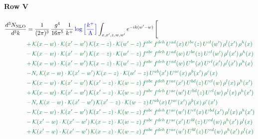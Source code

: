 \documentclass[10pt]{article}
\numberwithin{equation}{section}
\newcommand{\new}[1]{{\color{blue}#1}}
\begin{document}
\paragraph{Row V}
\begin{align}
\frac{d^{3}N_{\mathrm{NLO}}}{d^{3}k} & = \frac{1}{(2\pi)^{3}}\,\frac{g^{4}}{16\pi^{5}}\,\frac{1}{k^{+}}\,\new{\log\Big[\frac{k^{+}}{\Lambda}\Big]}\int_{x,x',z,w,w'}e^{-ik(w'-w)}\,\Bigg[\notag\\ &{\color{JIM}  +\,\mathcal{K}(x-w)\cdot\mathcal{K}(x'-w')\,\mathcal{K}(x-z)\cdot\mathcal{K}(w'-z)\,f^{abc}\,f^{deh}\,U^{ad}(x)\,U^{be}(z)\,U^{cl}(w')\,\rho^{l}(x')\,\rho^{h}(x)} \notag\\
&{\color{JIM} -\,\mathcal{K}(x-w)\cdot\mathcal{K}(x'-w')\,\mathcal{K}(x-z)\cdot\mathcal{K}(w'-z)\,f^{abc}\,f^{deh}\,U^{ad}(w)\,U^{be}(z)\,U^{cl}(w')\,\rho^{l}(x')\,\rho^{h}(x)} \notag\\
&{\color{JIM} +\,\mathcal{K}(x-w)\cdot\mathcal{K}(x'-w')\,\mathcal{K}(x-z)\cdot\mathcal{K}(w'-z)\,f^{abc}\,f^{deh}\,U^{ad}(w)\,U^{be}(x)\,U^{cl}(x')\,\rho^{l}(x')\,\rho^{h}(x)} \notag\\
&{\color{JIM} -N_{c}\,\mathcal{K}(x-w)\cdot\mathcal{K}(x'-w')\,\mathcal{K}(x-z)\cdot\mathcal{K}(w'-z)\,U^{ab}(x')\,U^{ac}(x)\,\rho^{b}(x')\,\rho^{c}(x)} \notag\\
&{\color{JIM} -\,\mathcal{K}(x-w)\cdot\mathcal{K}(x'-w')\,\mathcal{K}(x'-z)\cdot\mathcal{K}(w-z)\,f^{abc}\,f^{deh}\,U^{ae}(x')\,U^{bd}(z)\,U^{cl}(w)\,\rho^{l}(x)\,\rho^{h}(x')} \notag\\
&{\color{JIM} +\,\mathcal{K}(x-w)\cdot\mathcal{K}(x'-w')\,\mathcal{K}(x'-z)\cdot\mathcal{K}(w-z)\,f^{abc}\,f^{deh}\,U^{ae}(w')\,U^{bd}(z)\,U^{cl}(w)\,\rho^{l}(x)\,\rho^{h}(x')} \notag\\
&{\color{JIM} -N_{c}\,\mathcal{K}(x-w)\cdot\mathcal{K}(x'-w')\,\mathcal{K}(x'-z)\cdot\mathcal{K}(w-z)\,U^{ab}(x)\,U^{ac}(x')\,\rho^{b}(x)\,\rho^{c}(x')} \notag\\
&{\color{JIM} -\,\mathcal{K}(x-w)\cdot\mathcal{K}(x'-w')\,\mathcal{K}(x'-z)\cdot\mathcal{K}(w-z)\,f^{abc}\,f^{deh}\,U^{ae}(w')\,U^{cl}(x)\,U^{bd}(x')\,\rho^{l}(x)\,\rho^{h}(x')} \notag\\
&{\color{JIM} -\,\mathcal{K}(x'-w)\cdot\mathcal{K}(x'-w')\,\mathcal{K}(x-z)\cdot\mathcal{K}(w-z)\,f^{abc}\,f^{deh}\,U^{ae}(x')\,U^{bl}(z)\,U^{cd}(w)\,\rho^{h}(x')\,\rho^{l}(x)} \notag\\
&{\color{JIM} +\,\mathcal{K}(x'-w)\cdot\mathcal{K}(x'-w')\,\mathcal{K}(x-z)\cdot\mathcal{K}(w-z)\,f^{abc}\,f^{deh}\,U^{ae}(w')\,U^{bl}(z)\,U^{cd}(w)\,\rho^{h}(x')\,\rho^{l}(x)} \notag\\

\end{align}
\end{document}
